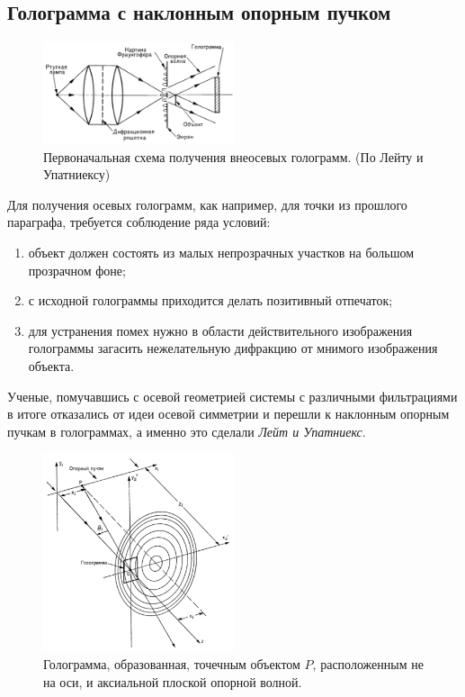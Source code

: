 \subsection{Голограмма с наклонным опорным пучком}
\begin{figure}
     \centering
     \includegraphics[width=0.5\textwidth]{figures/leyt_holo.png}
     \caption{Первоначальная схема получения внеосевых голограмм. (По Лейту и Упатниексу)}
 \end{figure}
Для получения осевых голограмм, как например, для точки из прошлого параграфа, требуется соблюдение ряда условий:
\begin{enumerate}
	\item объект должен состоять из малых непрозрачных участков на большом прозрачном фоне;
	\item с исходной голограммы приходится делать позитивный отпечаток;
	\item для устранения помех нужно в области действительного изображения голограммы загасить нежелательную дифракцию  от мнимого изображения объекта.
\end{enumerate}
Ученые, помучавшись с осевой геометрией системы с различными фильтрациями в итоге отказались от идеи осевой симметрии и перешли к наклонным опорным пучкам в голограммах, а именно это сделали \textit{Лейт и Упатниекс}. 

\begin{figure}
     \centering
     \includegraphics[width=0.5\textwidth]{figures/naclon_holo.png}
     \caption{Голограмма, образованная, точечным объектом $P$, расположенным не на оси, и аксиальной плоской опорной волной. }
     \label{fig:naclon}
 \end{figure}

